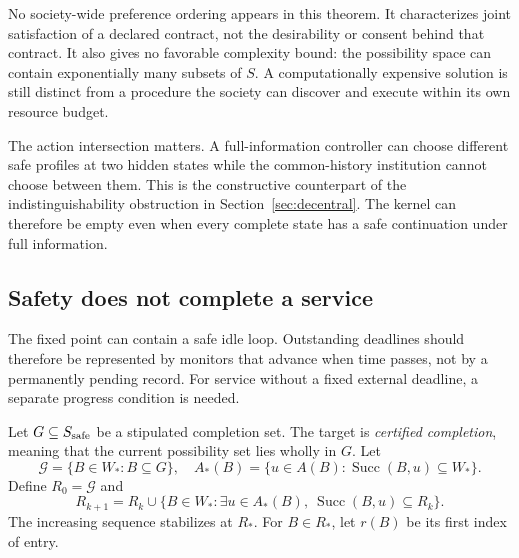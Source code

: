 \documentclass[11pt,letterpaper]{article}
\theoremstyle{plain}
\theoremstyle{definition}
\theoremstyle{remark}
\begin{document}
No society-wide preference ordering appears in this theorem. It characterizes joint satisfaction of a declared contract, not the desirability or consent behind that contract. It also gives no favorable complexity bound: the possibility space can contain exponentially many subsets of $S$. A computationally expensive solution is still distinct from a procedure the society can discover and execute within its own resource budget.

The action intersection matters. A full-information controller can choose different safe profiles at two hidden states while the common-history institution cannot choose between them. This is the constructive counterpart of the indistinguishability obstruction in Section~\ref{sec:decentral}. The kernel can therefore be empty even when every complete state has a safe continuation under full information.

\subsection{Safety does not complete a service}
The fixed point can contain a safe idle loop. Outstanding deadlines should therefore be represented by monitors that advance when time passes, not by a permanently pending record. For service without a fixed external deadline, a separate progress condition is needed.

Let $G\subseteq S_{\rm safe}$ be a stipulated completion set. The target is \emph{certified completion}, meaning that the current possibility set lies wholly in $G$. Let
\[
\mathcal G=\{B\in W_*:B\subseteq G\},
\quad
A_*(B)=\{u\in A(B):\operatorname{Succ}(B,u)\subseteq W_*\}.
\]
Define $R_0=\mathcal G$ and
\begin{equation}\label{eq:progress-attractor}
R_{k+1}=R_k\cup
\{B\in W_*:\exists u\in A_*(B),\
\operatorname{Succ}(B,u)\subseteq R_k\}.
\end{equation}
The increasing sequence stabilizes at $R_*$. For $B\in R_*$, let $r(B)$ be its first index of entry.
\end{document}

